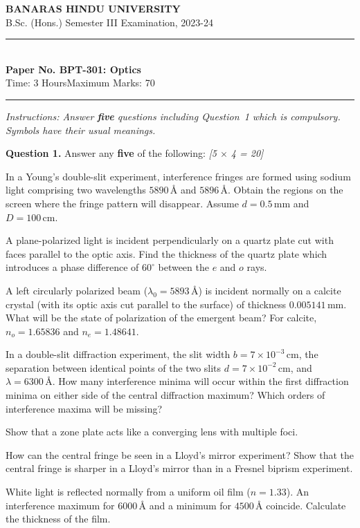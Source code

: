 \documentclass[11pt,a4paper]{article}
\newcommand{\pts}[1]{\hfill   \textit{[#1]}}
\begin{document}
\begin{center}
  {\large\bfseries BANARAS HINDU UNIVERSITY}\\[2pt]
  {\normalsize B.Sc. (Hons.) Semester III Examination, 2023-24}\\[6pt]
  \rule{0.8\linewidth}{0.5pt}\\[6pt]
  {\large\bfseries Paper No. BPT-301: Optics}\\[4pt]
  {\normalsize Time: 3 Hours\hfill Maximum Marks: 70}
\end{center}
\rule{\linewidth}{0.4pt}
\smallskip



\noindent   \textit{Instructions: Answer   \textbf{five} questions including Question~1 which is compulsory. Symbols have their usual meanings.}
\bigskip




\noindent   \textbf{Question 1.} Answer any   \textbf{five} of the following: \pts{5 $ \times$ 4 = 20}

\begin{parts}
  \item In a Young's double-slit experiment, interference fringes are formed using sodium light comprising two wavelengths $5890\, \text{\AA}$ and $5896\, \text{\AA}$. Obtain the regions on the screen where the fringe pattern will disappear. Assume $d = 0.5\, \text{mm}$ and $D = 100\, \text{cm}$.
  \item A plane-polarized light is incident perpendicularly on a quartz plate cut with faces parallel to the optic axis. Find the thickness of the quartz plate which introduces a phase difference of $60^\circ$ between the $e$ and $o$ rays.
  \item A left circularly polarized beam ($\lambda_0 = 5893\, \text{\AA}$) is incident normally on a calcite crystal (with its optic axis cut parallel to the surface) of thickness $0.005141\, \text{mm}$. What will be the state of polarization of the emergent beam? For calcite, $n_o = 1.65836$ and $n_e = 1.48641$.
  \item In a double-slit diffraction experiment, the slit width $b = 7  \times 10^{-3}\, \text{cm}$, the separation between identical points of the two slits $d = 7  \times 10^{-2}\, \text{cm}$, and $\lambda = 6300\, \text{\AA}$. How many interference minima will occur within the first diffraction minima on either side of the central diffraction maximum? Which orders of interference maxima will be missing?
  \item Show that a zone plate acts like a converging lens with multiple foci.
  \item How can the central fringe be seen in a Lloyd's mirror experiment? Show that the central fringe is sharper in a Lloyd's mirror than in a Fresnel biprism experiment.
  \item White light is reflected normally from a uniform oil film ($n = 1.33$). An interference maximum for $6000\, \text{\AA}$ and a minimum for $4500\, \text{\AA}$ coincide. Calculate the thickness of the film.
\end{parts}
\end{document}
